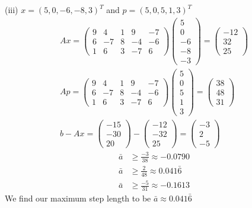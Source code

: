 \documentclass{article}
\begin{document}
\setcounter{equation}{0}
\noindent(iii) $x = (5, 0,-6,-8,3)^T$ and $p = (5,0,5,1,3)^T$
\begin{align*}
    Ax = \begin{pmatrix}
        9 & 4 & 1 & 9 & -7 \\
        6 & -7 & 8 & -4 & -6 \\ 
        1 & 6 & 3 & -7 & 6
    \end{pmatrix}
    \begin{pmatrix}
        5 \\ 0 \\ -6 \\ -8 \\ -3
    \end{pmatrix} = \begin{pmatrix}
        -12 \\ 32 \\ 25
    \end{pmatrix} \\
    Ap = \begin{pmatrix}
        9 & 4 & 1 & 9 & -7 \\
        6 & -7 & 8 & -4 & -6 \\ 
        1 & 6 & 3 & -7 & 6
    \end{pmatrix}
    \begin{pmatrix}
        5 \\ 0 \\ 5 \\ 1 \\ 3
    \end{pmatrix} = \begin{pmatrix}
        38 \\ 48 \\ 31
    \end{pmatrix} \\
    b - Ax = \begin{pmatrix}
        -15 \\ -30 \\ 20  
    \end{pmatrix} -
    \begin{pmatrix}
        -12 \\ -32 \\ 25
    \end{pmatrix} =
    \begin{pmatrix}
        -3 \\ 2 \\ -5
    \end{pmatrix} 
\end{align*}
\begin{align}
    \bar{a} &\geq \frac{-3}{38} \approx -0.0790 \\
    \bar{a} & \geq \frac{2}{48} \approx 0.041\bar{6} \\
    \bar{a} & \geq \frac{-5}{31} \approx -0.1613
\end{align}
We find our maximum step length to be $\bar{a} \approx 0.041\bar{6}$
\end{document}
